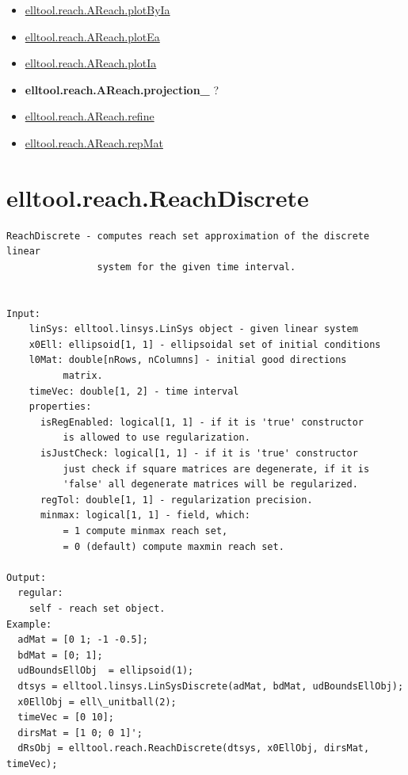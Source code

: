 \documentclass[letterpaper,10pt,english]{sphinxmanual}
\begin{document}
\begin{itemize}
\item {} 
{\hyperref[chap_func:elltool-reach-areach-plotbyia]{elltool.reach.AReach.plotByIa}}

\item {} 
{\hyperref[chap_func:elltool-reach-areach-plotea]{elltool.reach.AReach.plotEa}}

\item {} 
{\hyperref[chap_func:elltool-reach-areach-plotia]{elltool.reach.AReach.plotIa}}

\item {} 
{\color{red}\bfseries{}elltool.reach.AReach.projection\_} ?

\item {} 
{\hyperref[chap_func:elltool-reach-areach-refine]{elltool.reach.AReach.refine}}

\item {} 
{\hyperref[chap_func:elltool-reach-areach-repmat]{elltool.reach.AReach.repMat}}

\end{itemize}


\section{elltool.reach.ReachDiscrete}
\label{chap_func:elltool-reach-reachdiscrete}
\begin{Verbatim}[commandchars=\\\{\}]
ReachDiscrete - computes reach set approximation of the discrete linear
                system for the given time interval.


Input:
    linSys: elltool.linsys.LinSys object - given linear system
    x0Ell: ellipsoid[1, 1] - ellipsoidal set of initial conditions
    l0Mat: double[nRows, nColumns] - initial good directions
          matrix.
    timeVec: double[1, 2] - time interval
    properties:
      isRegEnabled: logical[1, 1] - if it is 'true' constructor
          is allowed to use regularization.
      isJustCheck: logical[1, 1] - if it is 'true' constructor
          just check if square matrices are degenerate, if it is
          'false' all degenerate matrices will be regularized.
      regTol: double[1, 1] - regularization precision.
      minmax: logical[1, 1] - field, which:
          = 1 compute minmax reach set,
          = 0 (default) compute maxmin reach set.

Output:
  regular:
    self - reach set object.
Example:
  adMat = [0 1; -1 -0.5];
  bdMat = [0; 1];
  udBoundsEllObj  = ellipsoid(1);
  dtsys = elltool.linsys.LinSysDiscrete(adMat, bdMat, udBoundsEllObj);
  x0EllObj = ell\_unitball(2);
  timeVec = [0 10];
  dirsMat = [1 0; 0 1]';
  dRsObj = elltool.reach.ReachDiscrete(dtsys, x0EllObj, dirsMat, timeVec);
\end{Verbatim}
\end{document}
